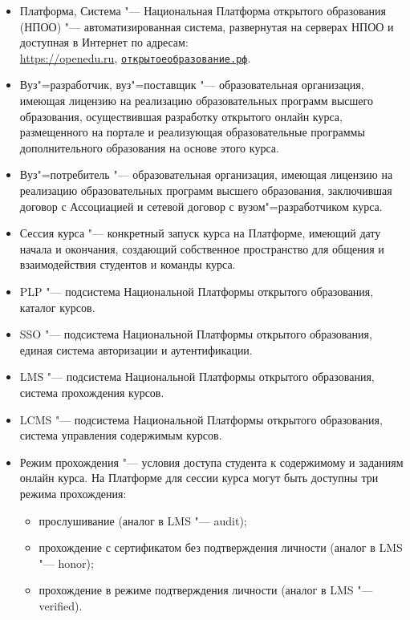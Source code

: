 \begin{itemize}
	\item Платформа, Система "--- Национальная Платформа открытого образования (НПОО) "--- автоматизированная система, 
	развернутая на серверах НПОО и доступная в Интернет по адресам: \\ 
	\url{https://openedu.ru}, \texttt{\href{https://openedu.ru}{открытоеобразование.рф}}.
	\item Вуз"=разработчик, вуз"=поставщик "--- образовательная организация, имеющая лицензию на реализацию образовательных программ 
	высшего образования, осуществившая разработку открытого онлайн курса, размещенного на портале 
	и реализующая образовательные программы дополнительного образования на основе этого курса.
	\item Вуз"=потребитель "--- образовательная организация, имеющая лицензию на реализацию образовательных программ 
	высшего образования, заключившая договор с Ассоциацией и сетевой договор с вузом"=разработчиком курса.
	\item Сессия курса "--- конкретный запуск курса на Платформе, имеющий дату начала и окончания,
	создающий собственное пространство для общения и взаимодействия студентов и команды курса.
	\item PLP "--- подсистема Национальной Платформы открытого образования, каталог курсов.
	\item SSO "--- подсистема Национальной Платформы открытого образования, единая система авторизации и аутентификации.
	\item LMS "--- подсистема Национальной Платформы открытого образования, система прохождения курсов.
	\item LCMS "--- подсистема Национальной Платформы открытого образования, система управления содержимым курсов.	
	\item Режим прохождения "--- условия доступа студента к содержимому и заданиям онлайн курса. 
	На Платформе для сессии курса могут быть доступны три режима прохождения:
	\begin{itemize}
		\item прослушивание (аналог в LMS "--- audit);
		\item прохождение с сертификатом без подтверждения личности (аналог в LMS "--- honor);
		\item прохождение в режиме подтверждения личности (аналог в LMS "--- verified).
	\end{itemize}
\end{itemize}


